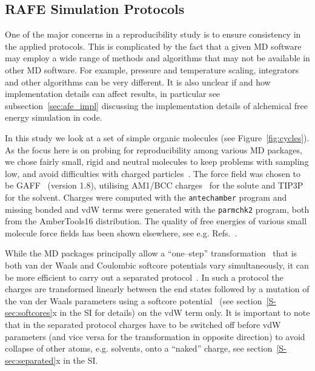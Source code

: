 \documentclass[journal=jctcce,manuscript=article]{achemso}
\newcommand{\progname}[1]{\texttt{#1}}
\begin{document}
\subsection{RAFE Simulation Protocols}
\label{sec:rafe_protocols}

One of the major concerns in a reproducibility study is to ensure
consistency in the applied protocols.  This is complicated by the fact
that a given MD software may employ a wide range of methods and algorithms that
may not be available in other MD software.  For example, pressure and
temperature scaling, integrators and other algorithms can be very
different.  It is also unclear if and how implementation details can
affect results, in particular see subsection~\ref{sec:afe_impl} discussing the 
implementation details of alchemical free energy simulation in code.

In this study we look at a set of simple organic molecules (see
Figure~\ref{fig:cycles}).  As the focus here is on probing for
reproducibility among various MD packages, we chose fairly small,
rigid and neutral molecules to keep problems with sampling low, and
avoid difficulties with charged
particles~\cite{rocklin_calculating_2013, JCC:JCC1050}.  The force
field was chosen to be GAFF~\cite{wang_development_2004} (version
1.8), utilising AM1/BCC charges~\cite{jakalian_fast_2000,
  jakalian_fast_2002} for the solute and
TIP3P~\cite{jorgensen_comparison_1983-1} for the solvent.  Charges were 
computed with the \progname{antechamber} program and missing bonded and vdW 
terms were generated with the \progname{parmchk2} program, both from the 
AmberTools16 distribution.  The quality of free energies of various small 
molecule force fields has been shown
elsewhere, see e.g. Refs.~.

While the MD packages principally allow a ``one--step'' 
transformation~\cite{steinbrecher_soft-core_2011}
that is both van der Waals and Coulombic softcore potentials vary
simultaneously, it can be more efficient to carry out a
separated protocol~\cite{naden_linear_2014, naden_linear_2015}. 
In such a protocol the charges are transformed
linearly between the end states followed by a mutation of the van der
Waals parameters using a softcore
potential~\cite{beutler_avoiding_1994,
  zacharias_separationshifted_1994} (see section~\ref{S-sec:softcores}x in the 
  SI for details) on the vdW
term only.  It is important to note that in the separated protocol
charges have to be switched off before vdW parameters (and vice versa
for the transformation in opposite direction) to avoid collapse of
other atoms, e.g. solvents, onto a ``naked'' charge, see 
section~\ref{S-sec:separated}x in the SI.
\end{document}
